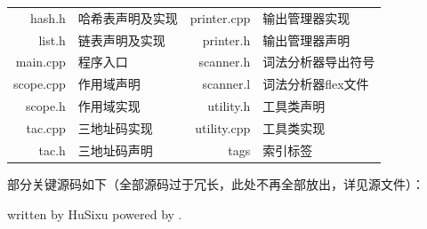 \documentclass{report}
\begin{document}
\begin{center}
\begin{longtable}{r l r l}
        hash.h         & 哈希表声明及实现       & printer.cpp   & 输出管理器实现\\
        list.h         & 链表声明及实现         & printer.h     & 输出管理器声明\\
        main.cpp       & 程序入口               & scanner.h     & 词法分析器导出符号\\
        scope.cpp      & 作用域声明             & scanner.l     & 词法分析器flex文件\\
        scope.h        & 作用域实现             & utility.h     & 工具类声明\\
        tac.cpp        & 三地址码实现           & utility.cpp   & 工具类实现\\
        tac.h          & 三地址码声明           & tags          & 索引标签\\
        \bottomrule
    \end{longtable}
\end{center}

\par 部分关键源码如下（全部源码过于冗长，此处不再全部放出，详见源文件）：

\nocite{*}



\vfill
{\tiny written by HuSixu \hfill powered by \XeLaTeX .}
\end{document}
